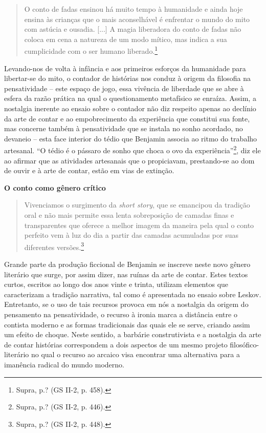 \begin{quote}
O conto de fadas ensinou há muito tempo à humanidade e ainda hoje ensina
às crianças que o mais aconselhável é enfrentar o mundo do mito com
astúcia e ousadia. {[}...{]} A magia liberadora do conto de fadas não
coloca em cena a natureza de um modo mítico, mas indica a sua
cumplicidade com o ser humano liberado.\footnote{Supra, p.? (GS II-2, p.
  458).}
\end{quote}

Levando-nos de volta à infância e aos primeiros esforços da humanidade
para libertar-se do mito, o contador de histórias nos conduz à origem da
filosofia na pensatividade -- este espaço de jogo, essa vivência de
liberdade que se abre à esfera da razão prática na qual o questionamento
metafísico se enraíza. Assim, a nostalgia inerente ao ensaio sobre o
contador não diz respeito apenas ao declínio da arte de contar e ao
empobrecimento da experiência que constitui sua fonte, mas concerne
também à pensatividade que se instala no sonho acordado, no devaneio --
esta face interior do tédio que Benjamin associa ao ritmo do trabalho
artesanal. ``O tédio é o pássaro de sonho que choca o ovo da
experiência''\footnote{Supra, p.? (GS II-2, p. 446).}, diz ele ao
afirmar que as atividades artesanais que o propiciavam, prestando-se ao
dom de ouvir e à arte de contar, estão em vias de extinção.

\textbf{O conto como gênero crítico}

\begin{quote}
Vivenciamos o surgimento da \emph{short story}, que se emancipou da
tradição oral e não mais permite essa lenta sobreposição de camadas
finas e transparentes que oferece a melhor imagem da maneira pela qual o
conto perfeito vem à luz do dia a partir das camadas acumuladas por suas
diferentes versões.\footnote{Supra, p.? (GS II-2, p. 448).}
\end{quote}

Grande parte da produção ficcional de Benjamin se inscreve neste novo
gênero literário que surge, por assim dizer, nas ruínas da arte de
contar. Estes textos curtos, escritos ao longo dos anos vinte e trinta,
utilizam elementos que caracterizam a tradição narrativa, tal como é
apresentada no ensaio sobre Leskov. Entretanto, se o uso de tais
recursos provoca em nós a nostalgia da origem do pensamento na
pensatividade, o recurso à ironia marca a distância entre o contista
moderno e as formas tradicionais das quais ele se serve, criando assim
um efeito de choque. Neste sentido, a barbárie construtivista e a
nostalgia da arte de contar histórias correspondem a dois aspectos de um
mesmo projeto filosófico-literário no qual o recurso ao arcaico visa
encontrar uma alternativa para a imanência radical do mundo moderno.


